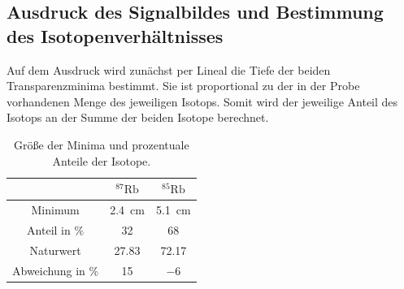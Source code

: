 \documentclass[
  bibliography=totoc,     %
  captions=tableheading,  %
  titlepage=firstiscover, %
]{scrartcl}
\begin{document}
\subsection{Ausdruck des Signalbildes und Bestimmung des Isotopenverhältnisses}
Auf dem Ausdruck wird zunächst per Lineal die Tiefe der beiden Transparenzminima
bestimmt. Sie ist proportional zu der in der Probe vorhandenen Menge des jeweiligen
Isotops. Somit wird der jeweilige Anteil des Isotops an der Summe der beiden
Isotope berechnet.
\begin{table}[H]
  \centering
  \caption{Größe der Minima und prozentuale Anteile der Isotope.}
  \label{tab:8}
  \begin{tabular}{c c c}
    \toprule
    & $^{87}\mathup{Rb}$ & $^{85}\mathup{Rb}$ \\
    \midrule
    Minimum & \SI{2.4}{\centi\meter} & \SI{5.1}{\centi\meter} \\
    Anteil in \si{\percent} & \num{32} & \num{68} \\
    Naturwert \cite{seilnacht} \cite{rubwi} & \num{27.83} & \num{72.17} \\
    Abweichung in \si{\percent} & \num{15} & \num{-6} \\
    \bottomrule
  \end{tabular}
\end{table}
\end{document}
